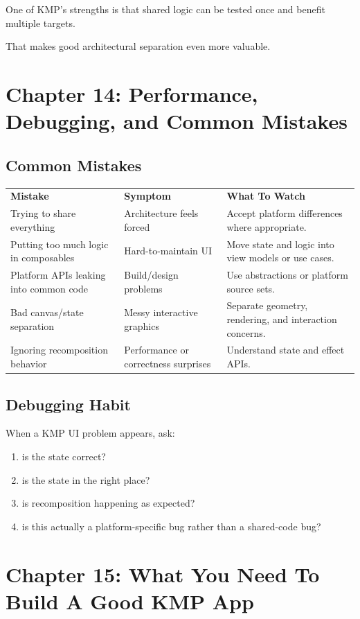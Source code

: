 \documentclass[11pt,a4paper]{article}
\begin{document}
One of KMP's strengths is that shared logic can be tested once and benefit multiple targets.

That makes good architectural separation even more valuable.

\section{Chapter 14: Performance, Debugging, and Common Mistakes}

\subsection{Common Mistakes}

\begin{longtable}{p{} p{} p{}}
\textbf{Mistake} & \textbf{Symptom} & \textbf{What To Watch} \\
Trying to share everything & Architecture feels forced & Accept platform differences where appropriate. \\
Putting too much logic in composables & Hard-to-maintain UI & Move state and logic into view models or use cases. \\
Platform APIs leaking into common code & Build/design problems & Use abstractions or platform source sets. \\
Bad canvas/state separation & Messy interactive graphics & Separate geometry, rendering, and interaction concerns. \\
Ignoring recomposition behavior & Performance or correctness surprises & Understand state and effect APIs. \\
\end{longtable}

\subsection{Debugging Habit}

When a KMP UI problem appears, ask:
\begin{enumerate}
    \item is the state correct?
    \item is the state in the right place?
    \item is recomposition happening as expected?
    \item is this actually a platform-specific bug rather than a shared-code bug?
\end{enumerate}

\section{Chapter 15: What You Need To Build A Good KMP App}
\end{document}
